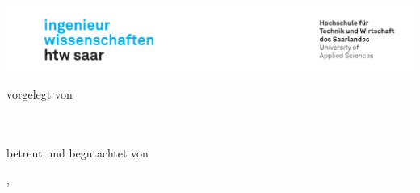 \begin{titlepage}\linespread{1.5}\selectfont
\includegraphics[width=\linewidth]{Graphics/htwsaar_Logo_inwi_head_VF_4C_crop}
  \begin{center}
    \large  
    \hfill
    \vfill
		
		
    
  \vfill
	
  \begingroup
    \Large\bfseries\myTitle 
  \endgroup
	
	\bigskip
	
  vorgelegt von \\
  \myNameOne \\
  \myNameTwo \\
  \myNameThree
	
  \vfill
	
  betreut und begutachtet von \\
  \myFirstProf %
	
  \vfill
	
  \myLocation, \myTime                   

    \end{center}       
\end{titlepage}   